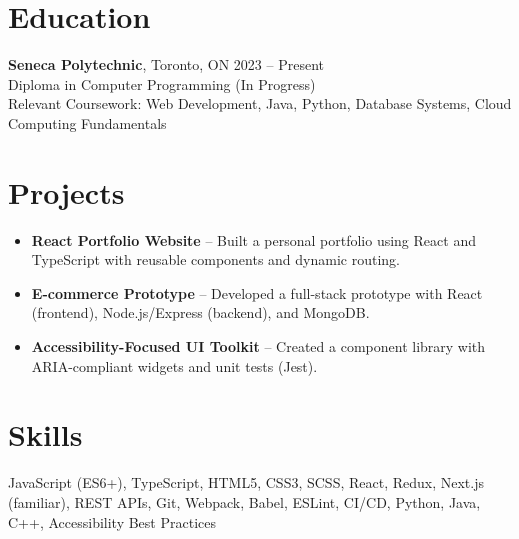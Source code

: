 \documentclass[a4paper,10pt]{article}
\begin{document}
\section*{Education}
\textbf{Seneca Polytechnic}, Toronto, ON \hfill 2023 -- Present \\
Diploma in Computer Programming (In Progress) \\
Relevant Coursework: Web Development, Java, Python, Database Systems, Cloud Computing Fundamentals

\section*{Projects}
\begin{itemize}[noitemsep,topsep=0pt]
    \item \textbf{React Portfolio Website} -- Built a personal portfolio using React and TypeScript with reusable components and dynamic routing.
    \item \textbf{E-commerce Prototype} -- Developed a full-stack prototype with React (frontend), Node.js/Express (backend), and MongoDB.
    \item \textbf{Accessibility-Focused UI Toolkit} -- Created a component library with ARIA-compliant widgets and unit tests (Jest).
\end{itemize}

\section*{Skills}
JavaScript (ES6+), TypeScript, HTML5, CSS3, SCSS, React, Redux, Next.js (familiar), REST APIs, Git, Webpack, Babel, ESLint, CI/CD, Python, Java, C++, Accessibility Best Practices
\end{document}
